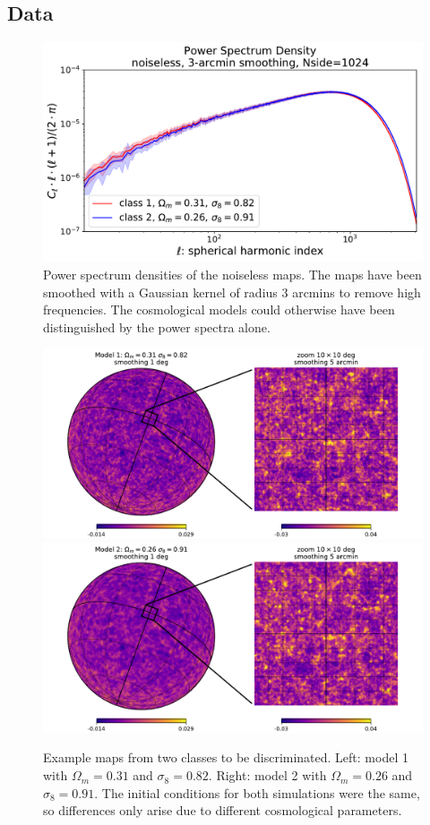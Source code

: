 \documentclass[final,twocolumn,3p,times,authoryear]{elsarticle}
\newcommand{\nati}[1]{{\color[rgb]{.1,.6,.1}{#1}}}
\newcommand{\1}{\b{1}}              %
\newcommand{\0}{\b{0}}              %
\begin{document}
\subsection{Data}
\label{sec:data}

\begin{figure}
\centering
\includegraphics[width=\linewidth]{psd_sigma3}
\caption{Power spectrum densities of the noiseless maps.
The maps have been smoothed with a Gaussian kernel of radius $3$ arcmins to remove high frequencies.
The cosmological models could otherwise have been distinguished by the power spectra alone.}
\label{fig:psd_sigma3}
\end{figure}


\begin{figure}
\centering
\includegraphics[trim=1cm 0cm 0cm 0cm, width=0.49\linewidth]{figures/figure_kappa_diff_model1.pdf}
\includegraphics[trim=0cm 0cm 1cm 0cm, width=0.49\linewidth]{figures/figure_kappa_diff_model2.pdf}
\caption{Example maps from two classes to be discriminated. Left: model 1 with $\Omega_m=0.31$ and $\sigma_8=0.82$. Right: model 2 with $\Omega_m=0.26$ and $\sigma_8=0.91$.
The initial conditions for both simulations were the same, so differences only arise due to different cosmological parameters. \nati{Tomek: Is this correct?}}
\label{fig:map_sample}
\end{figure}
\end{document}

